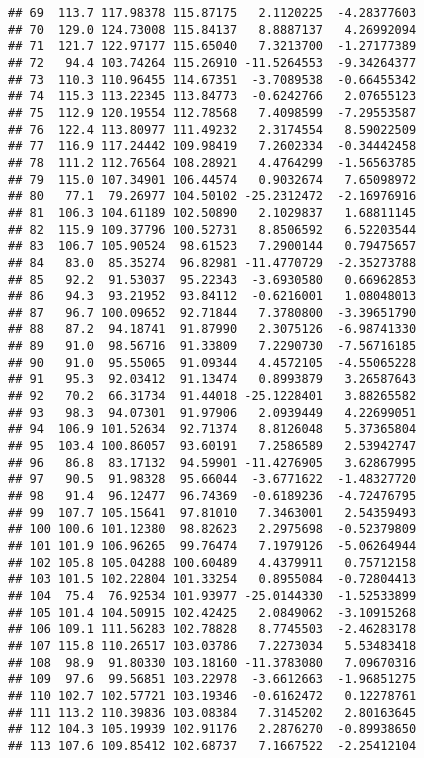 \documentclass{article}\usepackage[]{graphicx}\usepackage[]{color}
\makeatletter
\newenvironment{kframe}{%
 \def\at@end@of@kframe{}%
 \ifinner\ifhmode%
  \def\at@end@of@kframe{\end{minipage}}%
  \begin{minipage}{\columnwidth}%
 \fi\fi%
 \def\FrameCommand##1{\hskip\@totalleftmargin \hskip-\fboxsep
 \colorbox{shadecolor}{##1}\hskip-\fboxsep
     \hskip-\linewidth \hskip-\@totalleftmargin \hskip\columnwidth}%
 \MakeFramed {\advance\hsize-\width
   \@totalleftmargin\z@ \linewidth\hsize
   \@setminipage}}%
 {\par\unskip\endMakeFramed%
 \at@end@of@kframe}
\newenvironment{knitrout}{}{} %
\makeatother
\begin{document}
\begin{knitrout}
\begin{kframe}
\begin{verbatim}
## 69  113.7 117.98378 115.87175   2.1120225  -4.28377603
## 70  129.0 124.73008 115.84137   8.8887137   4.26992094
## 71  121.7 122.97177 115.65040   7.3213700  -1.27177389
## 72   94.4 103.74264 115.26910 -11.5264553  -9.34264377
## 73  110.3 110.96455 114.67351  -3.7089538  -0.66455342
## 74  115.3 113.22345 113.84773  -0.6242766   2.07655123
## 75  112.9 120.19554 112.78568   7.4098599  -7.29553587
## 76  122.4 113.80977 111.49232   2.3174554   8.59022509
## 77  116.9 117.24442 109.98419   7.2602334  -0.34442458
## 78  111.2 112.76564 108.28921   4.4764299  -1.56563785
## 79  115.0 107.34901 106.44574   0.9032674   7.65098972
## 80   77.1  79.26977 104.50102 -25.2312472  -2.16976916
## 81  106.3 104.61189 102.50890   2.1029837   1.68811145
## 82  115.9 109.37796 100.52731   8.8506592   6.52203544
## 83  106.7 105.90524  98.61523   7.2900144   0.79475657
## 84   83.0  85.35274  96.82981 -11.4770729  -2.35273788
## 85   92.2  91.53037  95.22343  -3.6930580   0.66962853
## 86   94.3  93.21952  93.84112  -0.6216001   1.08048013
## 87   96.7 100.09652  92.71844   7.3780800  -3.39651790
## 88   87.2  94.18741  91.87990   2.3075126  -6.98741330
## 89   91.0  98.56716  91.33809   7.2290730  -7.56716185
## 90   91.0  95.55065  91.09344   4.4572105  -4.55065228
## 91   95.3  92.03412  91.13474   0.8993879   3.26587643
## 92   70.2  66.31734  91.44018 -25.1228401   3.88265582
## 93   98.3  94.07301  91.97906   2.0939449   4.22699051
## 94  106.9 101.52634  92.71374   8.8126048   5.37365804
## 95  103.4 100.86057  93.60191   7.2586589   2.53942747
## 96   86.8  83.17132  94.59901 -11.4276905   3.62867995
## 97   90.5  91.98328  95.66044  -3.6771622  -1.48327720
## 98   91.4  96.12477  96.74369  -0.6189236  -4.72476795
## 99  107.7 105.15641  97.81010   7.3463001   2.54359493
## 100 100.6 101.12380  98.82623   2.2975698  -0.52379809
## 101 101.9 106.96265  99.76474   7.1979126  -5.06264944
## 102 105.8 105.04288 100.60489   4.4379911   0.75712158
## 103 101.5 102.22804 101.33254   0.8955084  -0.72804413
## 104  75.4  76.92534 101.93977 -25.0144330  -1.52533899
## 105 101.4 104.50915 102.42425   2.0849062  -3.10915268
## 106 109.1 111.56283 102.78828   8.7745503  -2.46283178
## 107 115.8 110.26517 103.03786   7.2273034   5.53483418
## 108  98.9  91.80330 103.18160 -11.3783080   7.09670316
## 109  97.6  99.56851 103.22978  -3.6612663  -1.96851275
## 110 102.7 102.57721 103.19346  -0.6162472   0.12278761
## 111 113.2 110.39836 103.08384   7.3145202   2.80163645
## 112 104.3 105.19939 102.91176   2.2876270  -0.89938650
## 113 107.6 109.85412 102.68737   7.1667522  -2.25412104

\end{verbatim}
\end{kframe}
\end{knitrout}
\end{document}
